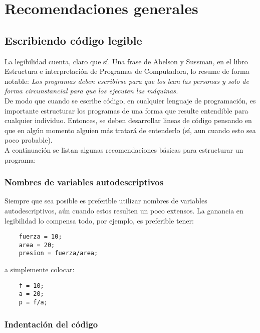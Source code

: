 \chapter{Recomendaciones generales}

\section{Escribiendo código legible}

La legibilidad cuenta, claro que sí. Una frase de Abelson y Sussman, en el libro Estructura e interpretación de 
Programas de Computadora, lo resume de forma notable: \textit{Los programas deben escribirse para que los lean las 
personas y solo de forma circunstancial para que los ejecuten las máquinas.}\\

De modo que cuando se escribe código, en cualquier lenguaje de programación, es importante estructurar 
los programas de una forma que resulte entendible para cualquier individuo. Entonces, se deben desarrollar 
lineas de código pensando en que en algún momento alguien más tratará de entenderlo (sí, aun cuando esto sea 
poco probable).\\

A continuación se listan algunas recomendaciones básicas para estructurar un programa:

\subsection{Nombres de variables autodescriptivos}

Siempre que sea posible es preferible utilizar nombres de variables autodescriptivos, aún cuando estos resulten 
un poco extensos. La ganancia en legibilidad lo compensa todo, por ejemplo, es preferible tener:

\begin{verbatim}
	fuerza = 10;
	area = 20;
	presion = fuerza/area;
\end{verbatim}

a simplemente colocar:
	
\begin{verbatim}
	f = 10;
	a = 20;
	p = f/a;
\end{verbatim}

\subsection{Indentación del código}

